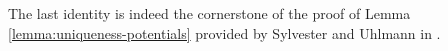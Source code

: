 \documentclass[12pt]{article}
\newtheorem{theorem}{Theorem}
\begin{document}
The last identity is indeed the cornerstone of the proof of Lemma \ref{lemma:uniqueness-potentials} provided by Sylvester and Uhlmann in \cite{Sylvester-Uhlmann}. 


\end{document}
